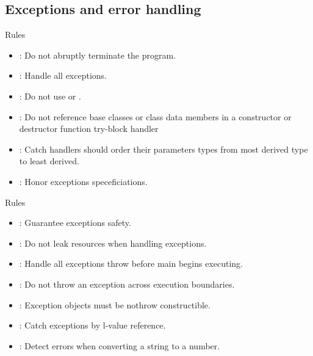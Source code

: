 \subsection{Exceptions and error handling}

\begin{frame}[t]{Rules}
\begin{itemize}
  \item {}: 
        Do not abruptly terminate the program.
  \vfill
  \item {}: 
        Handle all exceptions.
  \vfill
  \item {}: 
        Do not use  or .
  \vfill
  \item {}: 
        Do not reference base classes or class data members in a constructor
        or destructor function try-block handler
  \vfill
  \item {}: 
        Catch handlers should order their parameters types from most derived type to least
        derived.
  \vfill
  \item {}: 
        Honor exceptions speceficiations.
\end{itemize}
\end{frame}


\begin{frame}[t]{Rules}
\begin{itemize}
  \vfill
  \item {}: 
        Guarantee exceptions safety.
  \vfill
  \item {}: 
        Do not leak resources when handling exceptions.
  \vfill
  \item {}: 
        Handle all exceptions throw before main begins executing.
  \vfill
  \item {}: 
        Do not throw an exception across execution boundaries.
  \vfill
  \item {}: 
        Exception objects must be nothrow constructible.
  \vfill
  \item {}: 
        Catch exceptions by l-value reference.
  \vfill
  \item {}: 
        Detect errors when converting a string to a number.
\end{itemize}
\end{frame}

